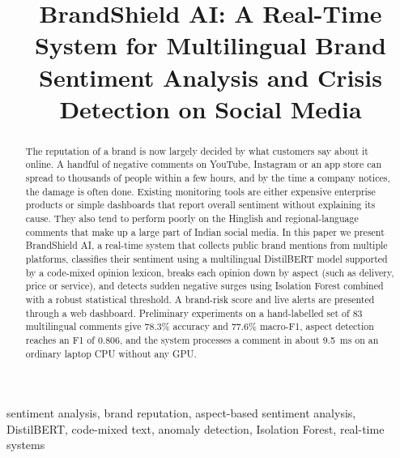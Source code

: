 \documentclass[conference]{IEEEtran}
\begin{document}
\title{BrandShield AI: A Real-Time System for Multilingual Brand Sentiment Analysis and Crisis Detection on Social Media}

\author{
\and
{}
}

\maketitle

\begin{abstract}
The reputation of a brand is now largely decided by what customers say about it online. A handful of
negative comments on YouTube, Instagram or an app store can spread to thousands of people within a
few hours, and by the time a company notices, the damage is often done. Existing monitoring tools are
either expensive enterprise products or simple dashboards that report overall sentiment without
explaining its cause. They also tend to perform poorly on the Hinglish and regional-language comments
that make up a large part of Indian social media. In this paper we present BrandShield AI, a
real-time system that collects public brand mentions from multiple platforms, classifies their
sentiment using a multilingual DistilBERT model supported by a code-mixed opinion lexicon, breaks each
opinion down by aspect (such as delivery, price or service), and detects sudden negative surges using
Isolation Forest combined with a robust statistical threshold. A brand-risk score and live alerts are
presented through a web dashboard. Preliminary experiments on a hand-labelled set of 83 multilingual
comments give 78.3\% accuracy and 77.6\% macro-F1, aspect detection reaches an F1 of 0.806, and the
system processes a comment in about 9.5~ms on an ordinary laptop CPU without any GPU.
\end{abstract}

\begin{IEEEkeywords}
sentiment analysis, brand reputation, aspect-based sentiment analysis, DistilBERT, code-mixed text,
anomaly detection, Isolation Forest, real-time systems
\end{IEEEkeywords}
\end{document}
